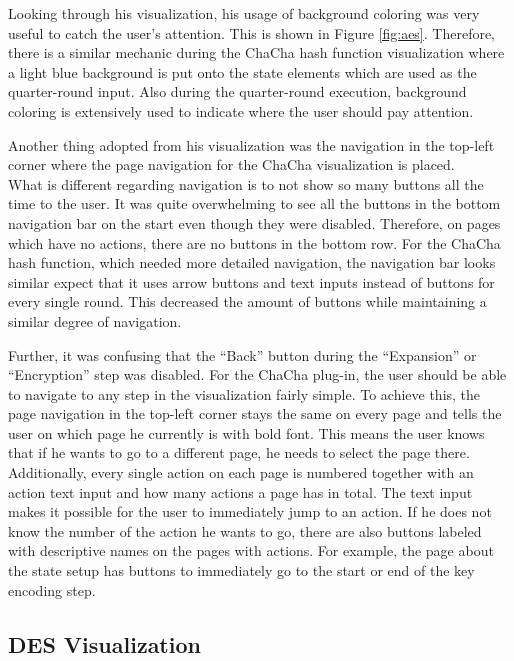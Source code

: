 Looking through his visualization, his usage of background coloring was very useful to catch the user's attention. This is shown in Figure \ref{fig:aes}. Therefore, there is a similar mechanic during the ChaCha hash function visualization where a light blue background is put onto the state elements which are used as the quarter-round input. Also during the quarter-round execution, background coloring is extensively used to indicate where the user should pay attention.

Another thing adopted from his visualization was the navigation in the top-left corner where the page navigation for the ChaCha visualization is placed. \\
What is different regarding navigation is to not show so many buttons all the time to the user. It was quite overwhelming to see all the buttons in the bottom navigation bar on the start even though they were disabled. Therefore, on pages which have no actions, there are no buttons in the bottom row. For the ChaCha hash function, which needed more detailed navigation, the navigation bar looks similar expect that it uses arrow buttons and text inputs instead of buttons for every single round. This decreased the amount of buttons while maintaining a similar degree of navigation.

Further, it was confusing that the ``Back'' button during the ``Expansion'' or ``Encryption'' step was disabled. For the ChaCha plug-in, the user should be able to navigate to any step in the visualization fairly simple. To achieve this, the page navigation in the top-left corner stays the same on every page and tells the user on which page he currently is with bold font. This means the user knows that if he wants to go to a different page, he needs to select the page there. Additionally, every single action on each page is numbered together with an action text input and how many actions a page has in total. The text input makes it possible for the user to immediately jump to an action. If he does not know the number of the action he wants to go, there are also buttons labeled with descriptive names on the pages with actions. For example, the page about the state setup has buttons to immediately go to the start or end of the key encoding step.

\subsection{DES Visualization}
\label{sec:desVisualization}

